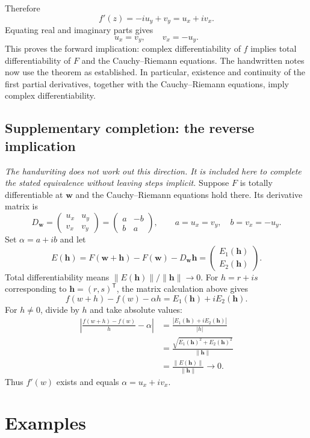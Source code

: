 \documentclass[11pt]{article}
\newcommand{\ww}{\mathbf w}
\newcommand{\hh}{\mathbf h}
\begin{document}
Therefore
\[
 \boxed{f'(z)=-iu_y+v_y=u_x+iv_x.}
\]
Equating real and imaginary parts gives
\[
 \boxed{u_x=v_y,\qquad v_x=-u_y.}
\]
This proves the forward implication: complex differentiability of $f$
implies total differentiability of $F$ and the Cauchy--Riemann equations.
The handwritten notes now use the theorem as established. In particular,
existence and continuity of the first partial derivatives, together with
the Cauchy--Riemann equations, imply complex differentiability.

\subsection*{Supplementary completion: the reverse implication}
\textit{The handwriting does not work out this direction. It is included
here to complete the stated equivalence without leaving steps implicit.}
Suppose $F$ is totally differentiable at $\ww$ and the Cauchy--Riemann
equations hold there. Its derivative matrix is
\[
 D_{\ww}=\begin{pmatrix}u_x&u_y\\v_x&v_y\end{pmatrix}
 =\begin{pmatrix}a&-b\\b&a\end{pmatrix},
 \qquad a=u_x=v_y,\quad b=v_x=-u_y.
\]
Set $\alpha=a+ib$ and let
\[
 E(\hh)=F(\ww+\hh)-F(\ww)-D_{\ww}\hh
 =\begin{pmatrix}E_1(\hh)\\E_2(\hh)\end{pmatrix}.
\]
Total differentiability means $\|E(\hh)\|/\|\hh\|\to0$.
For $h=r+is$ corresponding to $\hh=(r,s)^{\mathsf T}$, the matrix
calculation above gives
\[
 f(w+h)-f(w)-\alpha h=E_1(\hh)+iE_2(\hh).
\]
For $h\ne0$, divide by $h$ and take absolute values:
\begin{align*}
 \left|\frac{f(w+h)-f(w)}h-\alpha\right|
 &=\frac{|E_1(\hh)+iE_2(\hh)|}{|h|}\\
 &=\frac{\sqrt{E_1(\hh)^2+E_2(\hh)^2}}{\|\hh\|}\\
 &=\frac{\|E(\hh)\|}{\|\hh\|}\longrightarrow0.
\end{align*}
Thus $f'(w)$ exists and equals $\alpha=u_x+iv_x$.

\section{Examples}
\end{document}
